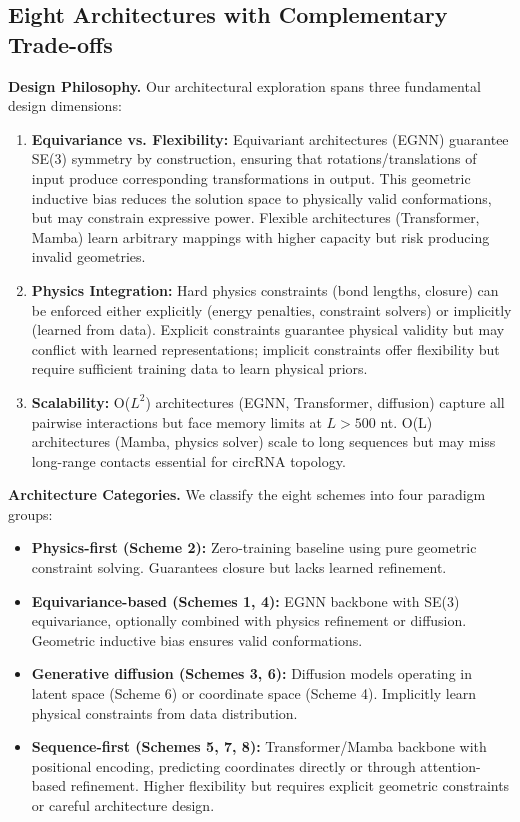 \documentclass[12pt]{article}
\begin{document}
\subsection{Eight Architectures with Complementary Trade-offs}

\textbf{Design Philosophy.} Our architectural exploration spans three fundamental design dimensions:

\begin{enumerate}
\item \textbf{Equivariance vs. Flexibility:} Equivariant architectures (EGNN) guarantee SE(3) symmetry by construction, ensuring that rotations/translations of input produce corresponding transformations in output. This geometric inductive bias reduces the solution space to physically valid conformations, but may constrain expressive power. Flexible architectures (Transformer, Mamba) learn arbitrary mappings with higher capacity but risk producing invalid geometries.

\item \textbf{Physics Integration:} Hard physics constraints (bond lengths, closure) can be enforced either explicitly (energy penalties, constraint solvers) or implicitly (learned from data). Explicit constraints guarantee physical validity but may conflict with learned representations; implicit constraints offer flexibility but require sufficient training data to learn physical priors.

\item \textbf{Scalability:} O($L^2$) architectures (EGNN, Transformer, diffusion) capture all pairwise interactions but face memory limits at $L>500$ nt. O(L) architectures (Mamba, physics solver) scale to long sequences but may miss long-range contacts essential for circRNA topology.
\end{enumerate}

\textbf{Architecture Categories.} We classify the eight schemes into four paradigm groups:

\begin{itemize}
\item \textbf{Physics-first (Scheme 2):} Zero-training baseline using pure geometric constraint solving. Guarantees closure but lacks learned refinement.

\item \textbf{Equivariance-based (Schemes 1, 4):} EGNN backbone with SE(3) equivariance, optionally combined with physics refinement or diffusion. Geometric inductive bias ensures valid conformations.

\item \textbf{Generative diffusion (Schemes 3, 6):} Diffusion models operating in latent space (Scheme 6) or coordinate space (Scheme 4). Implicitly learn physical constraints from data distribution.

\item \textbf{Sequence-first (Schemes 5, 7, 8):} Transformer/Mamba backbone with positional encoding, predicting coordinates directly or through attention-based refinement. Higher flexibility but requires explicit geometric constraints or careful architecture design.
\end{itemize}
\end{document}
